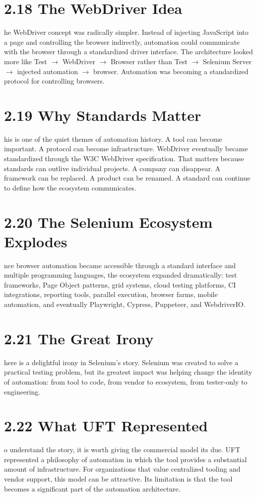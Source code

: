 \documentclass[11pt, a4paper, openany]{book}
\newcommand{\initialcap}[1]{{\fontfamily{lmss}\selectfont\huge\textbf{#1}}}
\begin{document}
\section{2.18 The WebDriver Idea}
\noindent \initialcap{T}he WebDriver concept was radically simpler. Instead of injecting JavaScript into a page and controlling the browser indirectly, automation could communicate with the browser through a standardized driver interface. The architecture looked more like Test $\rightarrow$ WebDriver $\rightarrow$ Browser rather than Test $\rightarrow$ Selenium Server $\rightarrow$ injected automation $\rightarrow$ browser. Automation was becoming a standardized protocol for controlling browsers.

\section{2.19 Why Standards Matter}
\noindent \initialcap{T}his is one of the quiet themes of automation history. A tool can become important. A protocol can become infrastructure. WebDriver eventually became standardized through the W3C WebDriver specification. That matters because standards can outlive individual projects. A company can disappear. A framework can be replaced. A product can be renamed. A standard can continue to define how the ecosystem communicates.

\section{2.20 The Selenium Ecosystem Explodes}
\noindent \initialcap{O}nce browser automation became accessible through a standard interface and multiple programming languages, the ecosystem expanded dramatically: test frameworks, Page Object patterns, grid systems, cloud testing platforms, CI integrations, reporting tools, parallel execution, browser farms, mobile automation, and eventually Playwright, Cypress, Puppeteer, and WebdriverIO.

\section{2.21 The Great Irony}
\noindent \initialcap{T}here is a delightful irony in Selenium's story. Selenium was created to solve a practical testing problem, but its greatest impact was helping change the identity of automation: from tool to code, from vendor to ecosystem, from tester-only to engineering.

\section{2.22 What UFT Represented}
\noindent \initialcap{T}o understand the story, it is worth giving the commercial model its due. UFT represented a philosophy of automation in which the tool provides a substantial amount of infrastructure. For organizations that value centralized tooling and vendor support, this model can be attractive. Its limitation is that the tool becomes a significant part of the automation architecture.
\end{document}
